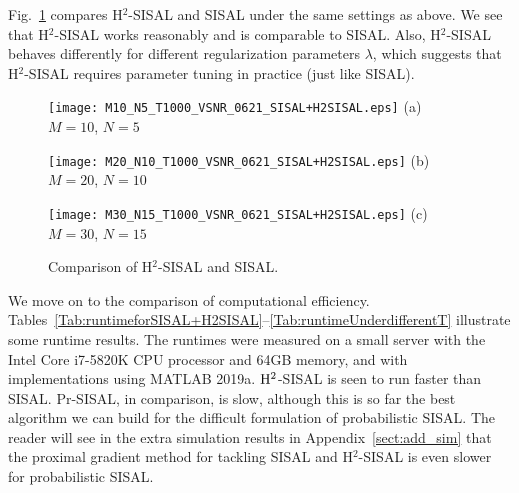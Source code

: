 \documentclass[10pt,twocolumn,twoside]{IEEEtran}
\begin{document}
Fig.~\ref{fig:H2SISAL} compares H$^2$-SISAL and SISAL under the same settings as above.
We see that H$^2$-SISAL works reasonably and is comparable to SISAL.
Also, H$^2$-SISAL behaves differently for different regularization parameters $\lambda$, which suggests that H$^2$-SISAL requires parameter tuning in practice (just like SISAL).



\begin{figure}[p]
	\centering
	\begin{minipage}[b]{.75\textwidth}
		\centering
		\texttt{[image: M10\_N5\_T1000\_VSNR\_0621\_SISAL+H2SISAL.eps]}
		(a) $M = 10$, $N = 5$
	\end{minipage}
	\begin{minipage}[b]{.75\textwidth}
		\centering
		\texttt{[image: M20\_N10\_T1000\_VSNR\_0621\_SISAL+H2SISAL.eps]}
		(b) $M = 20$, $N = 10$
	\end{minipage}
	\begin{minipage}[b]{.75\textwidth}
		\centering
		\texttt{[image: M30\_N15\_T1000\_VSNR\_0621\_SISAL+H2SISAL.eps]}
		(c) $M = 30$, $N = 15$
	\end{minipage}
	\caption{Comparison of H$^2$-SISAL and SISAL.}
	\label{fig:H2SISAL}	
\end{figure}

We move on to the comparison of computational efficiency.
Tables~\ref{Tab:runtimeforSISAL+H2SISAL}--\ref{Tab:runtimeUnderdifferentT} illustrate some runtime results.
The runtimes were measured on a small server with the Intel  Core i7-5820K CPU processor and 64GB memory, and with implementations using MATLAB 2019a.
${\rm H}^2$-SISAL is seen to run faster than SISAL.
Pr-SISAL, in comparison, is slow, although this is so far the best algorithm we can build for the difficult formulation of probabilistic SISAL.
The reader will see in the extra simulation results in Appendix~\ref{sect:add_sim} that the proximal gradient method for tackling SISAL and H$^2$-SISAL is even slower for  probabilistic SISAL.

\end{document}
